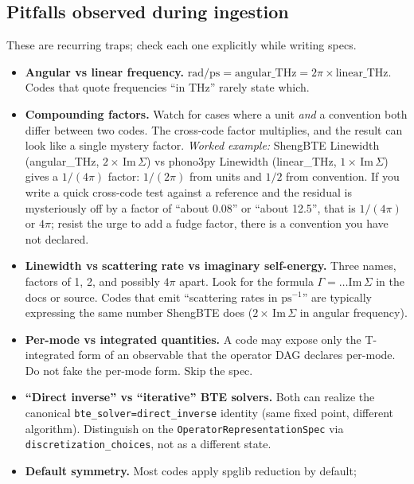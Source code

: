 \documentclass[11pt,a4paper]{article}
\begin{document}
\subsection{Pitfalls observed during ingestion}

These are recurring traps; check each one explicitly while writing specs.
\begin{itemize}[leftmargin=2em]
  \item \textbf{Angular vs linear frequency.}
        $\mathrm{rad/ps} = \mathrm{angular\_THz} = 2\pi \times \mathrm{linear\_THz}$.
        Codes that quote frequencies ``in THz'' rarely state which.
  \item \textbf{Compounding factors.} Watch for cases where a unit \emph{and} a
        convention both differ between two codes. The cross-code factor multiplies,
        and the result can look like a single mystery factor. \emph{Worked
        example:} ShengBTE Linewidth (angular\_THz, $2\times\,\mathrm{Im}\,\Sigma$)
        vs phono3py Linewidth (linear\_THz, $1\times\,\mathrm{Im}\,\Sigma$) gives a
        $1/(4\pi)$ factor: $1/(2\pi)$ from units and $1/2$ from convention. If you
        write a quick cross-code test against a reference and the residual is
        mysteriously off by a factor of ``about 0.08'' or ``about 12.5'', that is
        $1/(4\pi)$ or $4\pi$; resist the urge to add a fudge factor, there is a
        convention you have not declared.
  \item \textbf{Linewidth vs scattering rate vs imaginary self-energy.} Three
        names, factors of 1, 2, and possibly $4\pi$ apart. Look for the formula
        $\Gamma = \ldots \mathrm{Im}\,\Sigma$ in the docs or source. Codes that
        emit ``scattering rates in $\mathrm{ps^{-1}}$'' are typically expressing the
        same number ShengBTE does ($2\times\,\mathrm{Im}\,\Sigma$ in angular
        frequency).
  \item \textbf{Per-mode vs integrated quantities.} A code may expose only the
        T-integrated form of an observable that the operator DAG declares per-mode.
        Do not fake the per-mode form. Skip the spec.
  \item \textbf{``Direct inverse'' vs ``iterative'' BTE solvers.} Both can realize
        the canonical \texttt{bte\_solver=direct\_inverse} identity (same fixed
        point, different algorithm). Distinguish on the
        \texttt{OperatorRepresentationSpec} via \texttt{discretization\_choices},
        not as a different state.
  \item \textbf{Default symmetry.} Most codes apply spglib reduction by default;

\end{itemize}
\end{document}
